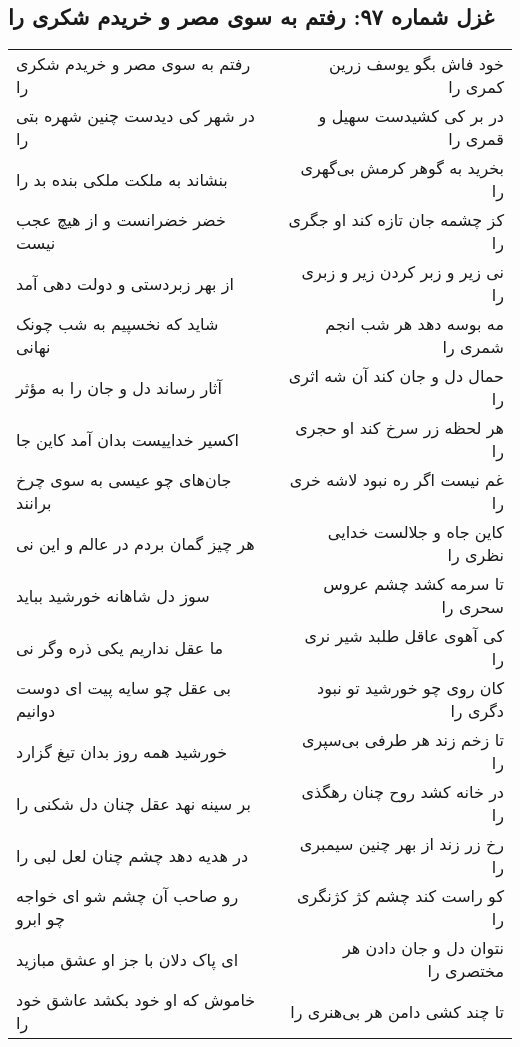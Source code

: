 \begin{center}
\section*{غزل شماره ۹۷: رفتم به سوی مصر و خریدم شکری را}
\label{sec:0097}
\begin{longtable}{l p{0.5cm} r}
رفتم به سوی مصر و خریدم شکری را
&&
خود فاش بگو یوسف زرین کمری را
\\
در شهر کی دیدست چنین شهره بتی را
&&
در بر کی کشیدست سهیل و قمری را
\\
بنشاند به ملکت ملکی بنده بد را
&&
بخرید به گوهر کرمش بی‌گهری را
\\
خضر خضرانست و از هیچ عجب نیست
&&
کز چشمه جان تازه کند او جگری را
\\
از بهر زبردستی و دولت دهی آمد
&&
نی زیر و زبر کردن زیر و زبری را
\\
شاید که نخسپیم به شب چونک نهانی
&&
مه بوسه دهد هر شب انجم شمری را
\\
آثار رساند دل و جان را به مؤثر
&&
حمال دل و جان کند آن شه اثری را
\\
اکسیر خداییست بدان آمد کاین جا
&&
هر لحظه زر سرخ کند او حجری را
\\
جان‌های چو عیسی به سوی چرخ برانند
&&
غم نیست اگر ره نبود لاشه خری را
\\
هر چیز گمان بردم در عالم و این نی
&&
کاین جاه و جلالست خدایی نظری را
\\
سوز دل شاهانه خورشید بباید
&&
تا سرمه کشد چشم عروس سحری را
\\
ما عقل نداریم یکی ذره وگر نی
&&
کی آهوی عاقل طلبد شیر نری را
\\
بی عقل چو سایه پیت ای دوست دوانیم
&&
کان روی چو خورشید تو نبود دگری را
\\
خورشید همه روز بدان تیغ گزارد
&&
تا زخم زند هر طرفی بی‌سپری را
\\
بر سینه نهد عقل چنان دل شکنی را
&&
در خانه کشد روح چنان رهگذی را
\\
در هدیه دهد چشم چنان لعل لبی را
&&
رخ زر زند از بهر چنین سیمبری را
\\
رو صاحب آن چشم شو ای خواجه چو ابرو
&&
کو راست کند چشم کژ کژنگری را
\\
ای پاک دلان با جز او عشق مبازید
&&
نتوان دل و جان دادن هر مختصری را
\\
خاموش که او خود بکشد عاشق خود را
&&
تا چند کشی دامن هر بی‌هنری را
\\
\end{longtable}
\end{center}
